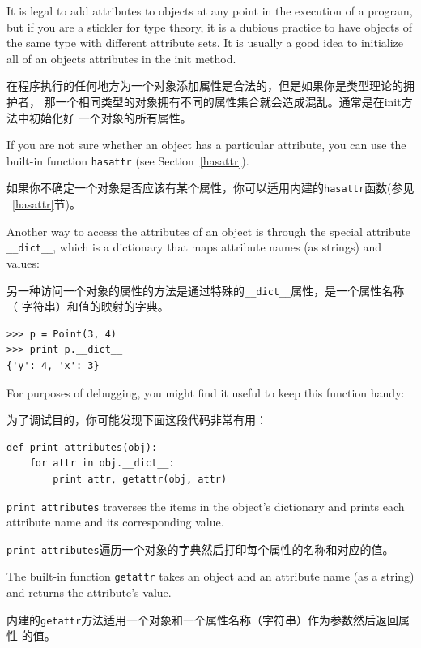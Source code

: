 \documentclass[10pt]{book}
\begin{document}
\begin{CJK}{UTF8}{gbsn}
It is legal to add attributes to objects at any point in the execution
of a program, but if you are a stickler for type theory, it is a
dubious practice to have objects of the same type with different
attribute sets.  It is usually a good idea to
initialize all of an objects attributes in the init method.

在程序执行的任何地方为一个对象添加属性是合法的，但是如果你是类型理论的拥护者，
那一个相同类型的对象拥有不同的属性集合就会造成混乱。通常是在init方法中初始化好
一个对象的所有属性。

If you are not sure whether an object has a particular attribute, you
can use the built-in function {\tt hasattr} (see Section~\ref{hasattr}).

如果你不确定一个对象是否应该有某个属性，你可以适用内建的{\tt hasattr}函数(参见
~\ref{hasattr}节)。

Another way to access the attributes of an object is through the
special attribute \verb"__dict__", which is a dictionary that maps
attribute names (as strings) and values:

另一种访问一个对象的属性的方法是通过特殊的\verb"__dict__"属性，是一个属性名称（
字符串）和值的映射的字典。

\begin{verbatim}
>>> p = Point(3, 4)
>>> print p.__dict__
{'y': 4, 'x': 3}
\end{verbatim}
%
For purposes of debugging, you might find it useful to keep this
function handy:

为了调试目的，你可能发现下面这段代码非常有用：

\begin{verbatim}
def print_attributes(obj):
    for attr in obj.__dict__:
        print attr, getattr(obj, attr)
\end{verbatim}
%
\verb"print_attributes" traverses the items in the object's dictionary
and prints each attribute name and its corresponding value.

\verb"print_attributes"遍历一个对象的字典然后打印每个属性的名称和对应的值。

The built-in function {\tt getattr} takes an object and an attribute
name (as a string) and returns the attribute's value.

内建的{\tt getattr}方法适用一个对象和一个属性名称（字符串）作为参数然后返回属性
的值。



\end{CJK}
\end{document}
